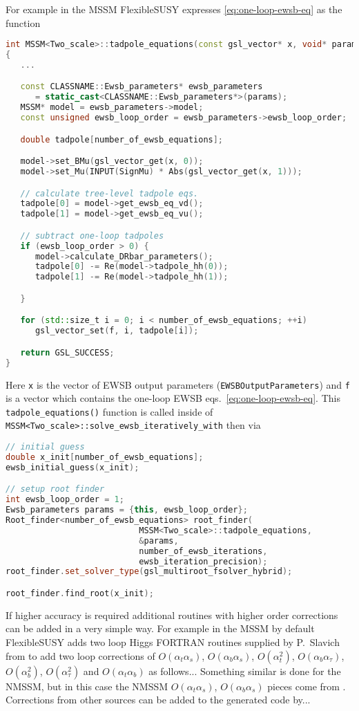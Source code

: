 \documentclass[final,3p,times,pdflatex]{elsarticle}
\newcommand{\fs}{FlexibleSUSY\xspace}
\newcommand{\code}[1]{\lstinline|#1|}  %
\def\at{\alpha_t}
\def\ab{\alpha_b}
\def\as{\alpha_s}
\def\atau{\alpha_{\tau}}
\def\oatab{O(\at\ab)}
\def\oatas{O(\at\as)}
\def\oabas{O(\ab\as)}
\def\oatq{O(\at^2)}
\def\oabq{O(\ab^2)}
\def\oatauq{O(\atau^2)}
\def\oabatau{O(\ab \atau)}
\begin{document}
For example in the MSSM \fs expresses \eqref{eq:one-loop-ewsb-eq} as
the function
%
\begin{lstlisting}[language=C++]
int MSSM<Two_scale>::tadpole_equations(const gsl_vector* x, void* params, gsl_vector* f)
{
   ...

   const CLASSNAME::Ewsb_parameters* ewsb_parameters
      = static_cast<CLASSNAME::Ewsb_parameters*>(params);
   MSSM* model = ewsb_parameters->model;
   const unsigned ewsb_loop_order = ewsb_parameters->ewsb_loop_order;

   double tadpole[number_of_ewsb_equations];

   model->set_BMu(gsl_vector_get(x, 0));
   model->set_Mu(INPUT(SignMu) * Abs(gsl_vector_get(x, 1)));

   // calculate tree-level tadpole eqs.
   tadpole[0] = model->get_ewsb_eq_vd();
   tadpole[1] = model->get_ewsb_eq_vu();

   // subtract one-loop tadpoles
   if (ewsb_loop_order > 0) {
      model->calculate_DRbar_parameters();
      tadpole[0] -= Re(model->tadpole_hh(0));
      tadpole[1] -= Re(model->tadpole_hh(1));

   }

   for (std::size_t i = 0; i < number_of_ewsb_equations; ++i)
      gsl_vector_set(f, i, tadpole[i]);

   return GSL_SUCCESS;
}
\end{lstlisting}
%
Here \code{x} is the vector of EWSB output parameters
(\code{EWSBOutputParameters}) and \code{f} is a vector which contains
the one-loop EWSB eqs.\ \eqref{eq:one-loop-ewsb-eq}.  This
\code{tadpole_equations()} function is called inside of
\code{MSSM<Two_scale>::solve_ewsb_iteratively_with} then via
%
\begin{lstlisting}[language=C++]
// initial guess
double x_init[number_of_ewsb_equations];
ewsb_initial_guess(x_init);

// setup root finder
int ewsb_loop_order = 1;
Ewsb_parameters params = {this, ewsb_loop_order};
Root_finder<number_of_ewsb_equations> root_finder(
                           MSSM<Two_scale>::tadpole_equations,
                           &params,
                           number_of_ewsb_iterations,
                           ewsb_iteration_precision);
root_finder.set_solver_type(gsl_multiroot_fsolver_hybrid);

root_finder.find_root(x_init);
\end{lstlisting}

If higher accuracy is required additional routines with higher order
corrections can be added in a very simple way.  For example in the
MSSM by default \fs adds two loop Higgs FORTRAN routines supplied by
P.~Slavich from \cite{slavich-degrassi} to add two loop corrections of
$\oatas$, $\oabas$, $\oatq$, $\oabatau$, $\oabq$, $\oatauq$ and
$\oatab$ as follows...  Something similar is done for the NMSSM, but
in this case the NMSSM $\oatas$, $\oabas$ pieces come from
\cite{Degrassi:2009yq}.  Corrections from other sources can be added
to the generated code by...
\end{document}
